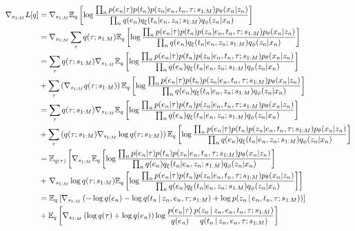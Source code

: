 \begin{equation}
    \begin{split}
    \nabla_{s_{1:M}}L[q] &=
    \nabla_{s_{1:M}}\mathbb{E}_q \left[\log \frac{\prod_n p(e_n|\tau) p(t_n) p(z_n | e_n, t_n, \tau; s_{1:M})p_\theta(x_n | z_n)}{\prod_n q(e_n)q_{\xi}(t_n | e_n, z_n; s_{1:M})q_\phi(z_n | x_n)}\right] \\
    &= \nabla_{s_{1:M}}\sum_{\tau} q(\tau; s_{1:M})\mathbb{E}_q \left[\log \frac{\prod_n p(e_n|\tau) p(t_n) p(z_n | e_n, t_n, \tau; s_{1:M})p_\theta(x_n | z_n)}{\prod_n q(e_n)q_{\xi}(t_n | e_n, z_n; s_{1:M})q_\phi(z_n | x_n)}\right]\\
    &= \sum_\tau q(\tau; s_{1:M})\nabla_{s_{1:M}}\mathbb{E}_q\left[\log \frac{\prod_n p(e_n|\tau) p(t_n) p(z_n | e_n, t_n, \tau; s_{1:M})p_\theta(x_n | z_n)}{\prod_n q(e_n)q_{\xi}(t_n | e_n, z_n; s_{1:M})q_\phi(z_n | x_n)}\right]\\
    &+ \sum_\tau \left(\nabla_{s_{1:M}} q(\tau; s_{1:M})\right)\mathbb{E}_q \left[\log \frac{\prod_n p(e_n|\tau) p(t_n) p(z_n | e_n, t_n, \tau; s_{1:M})p_\theta(x_n | z_n)}{\prod_n q(e_n)q_{\xi}(t_n | e_n, z_n; s_{1:M})q_\phi(z_n | x_n)}\right]\\
    &= \sum_\tau q(\tau; s_{1:M})\nabla_{s_{1:M}}\mathbb{E}_q\left[\log \frac{\prod_n p(e_n|\tau) p(t_n) p(z_n | e_n, t_n, \tau; s_{1:M})p_\theta(x_n | z_n)}{\prod_n q(e_n)q_{\xi}(t_n | e_n, z_n; s_{1:M})q_\phi(z_n | x_n)}\right]\\
    &+ \sum_\tau \left(q(\tau;s_{1:M})\nabla_{s_{1:M}} \log q(\tau; s_{1:M})\right)\mathbb{E}_q \left[\log \frac{\prod_n p(e_n|\tau) p(t_n) p(z_n | e_n, t_n, \tau; s_{1:M})p_\theta(x_n | z_n)}{\prod_n q(e_n)q_{\xi}(t_n | e_n, z_n; s_{1:M})q_\phi(z_n | x_n)}\right]\\
    &= \mathbb{E}_{q(\tau)}\left[\nabla_{s_{1:M}}\mathbb{E}_q\left[\log \frac{\prod_n p(e_n|\tau) p(t_n) p(z_n | e_n, t_n, \tau; s_{1:M})p_\theta(x_n | z_n)}{\prod_n q(e_n)q_{\xi}(t_n | e_n, z_n; s_{1:M})q_\phi(z_n | x_n)}\right]\right.\\
    &+ \left.\nabla_{s_{1:M}} \log q(\tau; s_{1:M})\mathbb{E}_q \left[\log \frac{\prod_n p(e_n|\tau) p(t_n) p(z_n | e_n, t_n, \tau; s_{1:M})p_\theta(x_n | z_n)}{\prod_n q(e_n)q_{\xi}(t_n | e_n, z_n; s_{1:M})q_\phi(z_n | x_n)}\right]\right]\\
    &= \mathbb{E}_{q}\left[
        \nabla_{s_{1:M}}\left(-\log q(e_n) - \log q(t_n \,|\, z_n, e_n, \tau; s_{1:M}) + \log p(z_n \,|\, e_n, t_n, \tau; s_{1:M})\right)
    \right] \\
    &+ \mathbb{E}_q\left[\nabla_{s_{1:M}}\left(\log q(\tau) + \log q(e_n)\right)\log\frac{p(e_n | \tau)}{q(e_n)}\frac{p(z_n \,|\, z_n, e_n, t_n, \tau; s_{1:M})}{q(t_n \,|\, z_n, e_n, \tau; s_{1:M})}\right]
    \end{split}
\end{equation}

